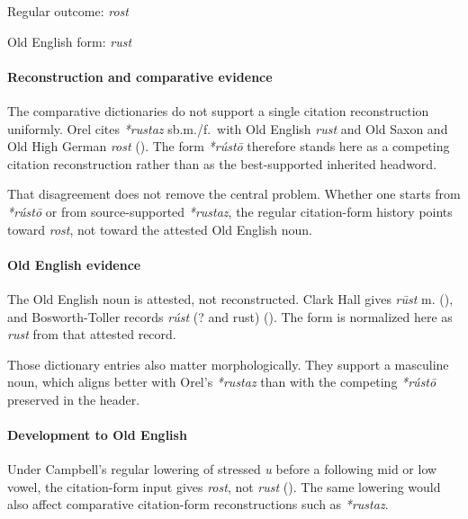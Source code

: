 \documentclass[
  british,
  a4paper,
]{article}
\begin{document}
Regular outcome: \emph{rost}

Old English form: \emph{rust}

\paragraph{Reconstruction and comparative
evidence}\label{reconstruction-and-comparative-evidence-74}

The comparative dictionaries do not support a single citation
reconstruction uniformly. Orel cites \emph{*rustaz} sb.m./f.~with Old
English \emph{rust} and Old Saxon and Old High German \emph{rost}
(). The form \emph{*rústō}
therefore stands here as a competing citation reconstruction rather than
as the best-supported inherited headword.

That disagreement does not remove the central problem. Whether one
starts from \emph{*rústō} or from source-supported \emph{*rustaz}, the
regular citation-form history points toward \emph{rost}, not toward the
attested Old English noun.

\paragraph{Old English evidence}\label{old-english-evidence-74}

The Old English noun is attested, not reconstructed. Clark Hall gives
\emph{rūst} m. (), and
Bosworth-Toller records \emph{rúst} (? and rust)
(). The
form is normalized here as \emph{rust} from that attested record.

Those dictionary entries also matter morphologically. They support a
masculine noun, which aligns better with Orel's \emph{*rustaz} than with
the competing \emph{*rústō} preserved in the header.

\paragraph{Development to Old
English}\label{development-to-old-english-74}

Under Campbell's regular lowering of stressed \emph{u} before a
following mid or low vowel, the citation-form input gives \emph{rost},
not \emph{rust} ().
The same lowering would also affect comparative citation-form
reconstructions such as \emph{*rustaz}.
\end{document}
